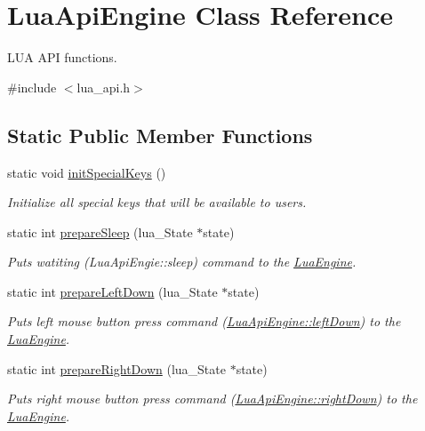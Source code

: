 \hypertarget{class_lua_api_engine}{\section{Lua\-Api\-Engine Class Reference}
\label{class_lua_api_engine}
}


L\-U\-A A\-P\-I functions.  




{\ttfamily \#include $<$lua\-\_\-api.\-h$>$}

\subsection*{Static Public Member Functions}
\begin{DoxyCompactItemize}
\item 
static void \hyperlink{class_lua_api_engine_a7f614e9a85e02951c0a21e694654b83a}{init\-Special\-Keys} ()
\begin{DoxyCompactList}\small\item\em Initialize all special keys that will be available to users. \end{DoxyCompactList}\item 
static int \hyperlink{class_lua_api_engine_a03308524bb7be3fca0e5865a0eba6c41}{prepare\-Sleep} (lua\-\_\-\-State $\ast$state)
\begin{DoxyCompactList}\small\item\em Puts watiting (Lua\-Api\-Engie\-::sleep) command to the \hyperlink{class_lua_engine}{Lua\-Engine}. \end{DoxyCompactList}\item 
static int \hyperlink{class_lua_api_engine_a5e6c9c1b66d19a4f65d6c65d6ae849a2}{prepare\-Left\-Down} (lua\-\_\-\-State $\ast$state)
\begin{DoxyCompactList}\small\item\em Puts left mouse button press command (\hyperlink{class_lua_api_engine_a5942498f999031601960d890b259536b}{Lua\-Api\-Engine\-::left\-Down}) to the \hyperlink{class_lua_engine}{Lua\-Engine}. \end{DoxyCompactList}\item 
static int \hyperlink{class_lua_api_engine_a9975cd495e847300968ce6149846c2f9}{prepare\-Right\-Down} (lua\-\_\-\-State $\ast$state)
\begin{DoxyCompactList}\small\item\em Puts right mouse button press command (\hyperlink{class_lua_api_engine_a14df77fdabe3ddf5dd19c35e70acb2d8}{Lua\-Api\-Engine\-::right\-Down}) to the \hyperlink{class_lua_engine}{Lua\-Engine}. \end{DoxyCompactList}\item 

\end{DoxyCompactItemize}
